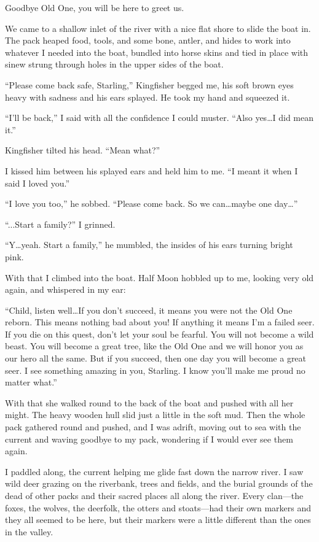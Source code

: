Goodbye Old One, you will be here to greet us.

We came to a shallow inlet of the river with a nice flat shore to slide the boat in. The pack heaped food, tools, and some bone, antler, and hides to work into whatever I needed into the boat, bundled into horse skins and tied in place with sinew strung through holes in the upper sides of the boat.

``Please come back safe, Starling,'' Kingfisher begged me, his soft brown eyes heavy with sadness and his ears splayed. He took my hand and squeezed it.

``I'll be back,'' I said with all the confidence I could muster. ``Also yes\ldots{}I did mean it.''

Kingfisher tilted his head. ``Mean what?''

I kissed him between his splayed ears and held him to me. ``I meant it when I said I loved you.''

``I love you too,'' he sobbed. ``Please come back. So we can\ldots{}maybe one day\ldots''

``...Start a family?'' I grinned.

``Y\ldots{}yeah. Start a family,'' he mumbled, the insides of his ears turning bright pink.

With that I climbed into the boat. Half Moon hobbled up to me, looking very old again, and whispered in my ear:

``Child, listen well\ldots{}If you don't succeed, it means you were not the Old One reborn. This means nothing bad about you! If anything it means I'm a failed seer. If you die on this quest, don't let your soul be fearful. You will not become a wild beast. You will become a great tree, like the Old One and we will honor you as our hero all the same. But if you succeed, then one day you will become a great seer. I see something amazing in you, Starling. I know you'll make me proud no matter what.''

With that she walked round to the back of the boat and pushed with all her might. The heavy wooden hull slid just a little in the soft mud. Then the whole pack gathered round and pushed, and I was adrift, moving out to sea with the current and waving goodbye to my pack, wondering if I would ever see them again.

I paddled along, the current helping me glide fast down the narrow river. I saw wild deer grazing on the riverbank, trees and fields, and the burial grounds of the dead of other packs and their sacred places all along the river. Every clan---the foxes, the wolves, the deerfolk, the otters and stoats---had their own markers and they all seemed to be here, but their markers were a little different than the ones in the valley.

